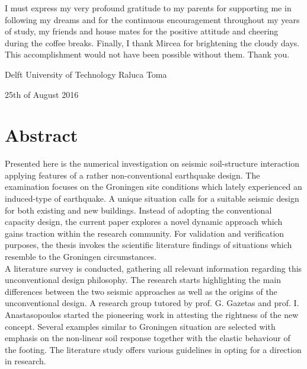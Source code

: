 \documentclass[11pt,a4paper]{report}
\newcommand\blankpage{%
	\null
	\thispagestyle{empty}%
	\addtocounter{page}{-1}%
	\newpage}
\begin{document}
I must express my very profound gratitude to my parents for supporting me in following my dreams and for the continuous encouragement throughout my years of study, my friends and house mates for the positive attitude and cheering during the coffee breaks. Finally, I thank Mircea for brightening the cloudy days. This accomplishment would not have been possible without them. Thank you.\

\vspace{3cm}
Delft University of Technology \hfill Raluca Toma

25th of August 2016

\afterpage{\blankpage}
\chapter*{Abstract}

\vspace{1cm}
Presented here is the numerical investigation on seismic soil-structure interaction applying features of a rather non-conventional earthquake design. The examination focuses on the Groningen site conditions which lately experienced an induced-type of earthquake. A unique situation calls for a suitable seismic design for both existing and new buildings. Instead of adopting the conventional capacity design, the current paper explores a novel dynamic approach which gains traction within the research community. For validation and verification purposes, the thesis invokes the scientific literature findings of situations which resemble to the Groningen circumstances.\\


A literature survey is conducted, gathering all relevant information regarding this unconventional design philosophy. The research starts highlighting the main differences between the two seismic approaches as well as the origins of the unconventional design. A research group tutored by prof. G. Gazetas and prof. I. Anastasopoulos started the pioneering work in attesting the rightness of the new concept. Several examples similar to Groningen situation are selected with emphasis on the non-linear soil response together with the elastic behaviour of the footing. The literature study offers various guidelines in opting for a direction in research.\\
\end{document}
